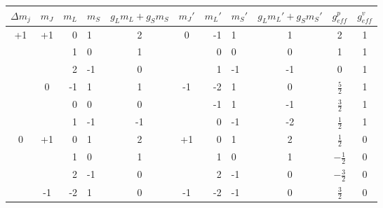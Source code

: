 \documentclass[bigchapter,colorback,accentcolor=tud4b,linedtoc,11pt]{tudreport}
\begin{document}
\begin{table}[H]
  \begin{center}
  \def\arraystretch{1.25}
  \begin{tabular}{|c||c|r@{|}l|c||c|r@{|}l|c||c|c|}
    \hline
     $\Delta m_j$        & $m_J$               & $m_L$ & $m_S$ & $g_Lm_L+g_Sm_S$ & $m_J'$              & $m_L'$ & $m_S'$ & $g_Lm_L'+g_Sm_S'$ & $g^p_{eff}$    & $g^v_{eff}$ \\ \hline
     \multirow{6}{*}{+1} & \multirow{3}{*}{+1} & 0     & 1     & 2               & \multirow{3}{*}{0}  & -1     & 1      & 1                 & 2              & 1           \\ 
                         &                     & 1     & 0     & 1               &                     & 0      & 0      & 0                 & 1              & 1           \\ 
                         &                     & 2     & -1    & 0               &                     & 1      & -1     & -1                & 0              & 1           \\ \cline{2-11}
                         & \multirow{3}{*}{0}  & -1    & 1     & 1               & \multirow{3}{*}{-1} & -2     & 1      & 0                 & $\frac{5}{2}$  & 1           \\ 
                         &                     & 0     & 0     & 0               &                     & -1     & 1      & -1                & $\frac{3}{2}$  & 1           \\ 
                         &                     & 1     & -1    & -1              &                     & 0      & -1     & -2                & $\frac{1}{2}$  & 1           \\ \hline
     \multirow{6}{*}{0}  & \multirow{3}{*}{+1} & 0     & 1     & 2               & \multirow{3}{*}{+1} & 0      & 1      & 2                 & $\frac{1}{2}$  & 0           \\ 
                         &                     & 1     & 0     & 1               &                     & 1      & 0      & 1                 & $-\frac{1}{2}$ & 0           \\ 
                         &                     & 2     & -1    & 0               &                     & 2      & -1     & 0                 & $-\frac{3}{2}$ & 0           \\ \cline{2-11}
                         & \multirow{3}{*}{-1} & -2    & 1     & 0               & \multirow{3}{*}{-1} & -2     & -1     & 0                 & $\frac{3}{2}$  & 0           \\ 

\end{tabular}
\end{center}
\end{table}
\end{document}
